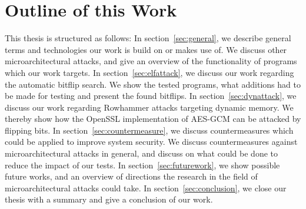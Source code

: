 \section{Outline of this Work}

This thesis is structured as follows: In section~\ref{sec:general}, we describe
general terms and technologies our work is build on or makes use of. We discuss
other microarchitectural attacks, and give an overview of the functionality of
programs which our work targets. In section~\ref{sec:elfattack}, we discuss our
work regarding the automatic bitflip search. We show the tested programs, what
additions had to be made for testing and present the found bitflips. In
section~\ref{sec:dynattack}, we discuss our work regarding Rowhammer attacks
targeting dynamic memory. We thereby show how the OpenSSL implementation of
AES-GCM can be attacked by flipping bits. In section~\ref{sec:countermeasure},
we discuss countermeasures which could be applied to improve system security. We
discuss countermeasures against microarchitectural attacks in general, and
discuss on what could be done to reduce the impact of our tests. In
section~\ref{sec:futurework}, we show possible future works, and an overview of
directions the research in the field of microarchitectural attacks could take.
In section~\ref{sec:conclusion}, we close our thesis with a summary and give a
conclusion of our work.

